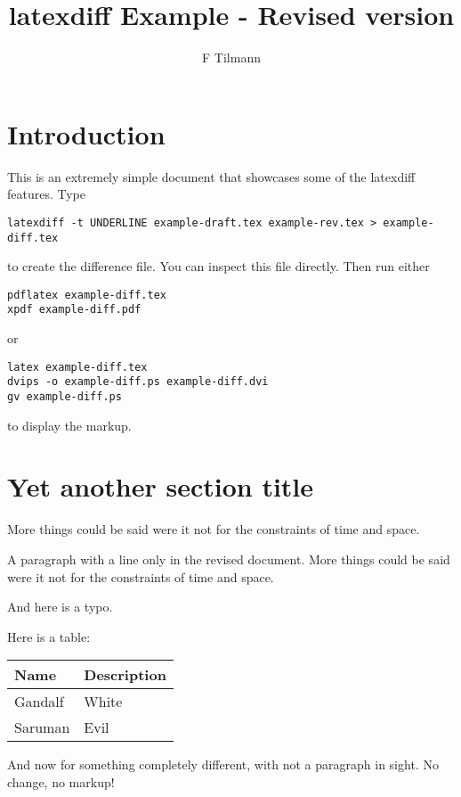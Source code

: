 \documentclass[12pt,a4paper]{article}
\title{latexdiff Example - Revised version}
\author{F Tilmann}
\begin{document}
\maketitle

\section*{Introduction}

This is an extremely simple document that showcases some of the latexdiff features.
Type
\begin{verbatim}
latexdiff -t UNDERLINE example-draft.tex example-rev.tex > example-diff.tex
\end{verbatim}
to create the difference file.  You can inspect this file directly. Then run either 
\begin{verbatim}
pdflatex example-diff.tex
xpdf example-diff.pdf
\end{verbatim}
or
\begin{verbatim}
latex example-diff.tex
dvips -o example-diff.ps example-diff.dvi
gv example-diff.ps
\end{verbatim}
to display the markup.

\section*{Yet another section title}

 More things could be said were it not for the constraints of time and space.

A paragraph with a line only in the revised document.  More things could be 
said were it not for the constraints of time and space.

And here is a typo. 

Here is a table:

\begin{tabular}{ll}
Name & Description \\
\hline
Gandalf & White \\
Saruman & Evil
\end{tabular}

And now for something completely different, with not a paragraph in sight.
No change, 
no markup!
\end{document}
